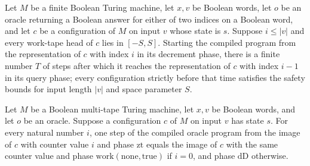 \begin{theorem}
\label{Complexity.LogProg.OIS.index_dec}
\leanok
{}
Let $M$ be a finite Boolean Turing machine, let $x,v$ be Boolean words, let $o$ be an
oracle returning a Boolean answer for either of two indices on a Boolean word, and let
$c$ be a configuration of $M$ on input $v$ whose state is $s$. Suppose $i\le |v|$ and
every work-tape head of $c$ lies in $[-S,S]$. Starting the compiled program from the
representation of $c$ with index $i$ in its decrement phase, there is a finite number
$T$ of steps after which it reaches the representation of $c$ with index $i-1$ in its
query phase; every configuration strictly before that time satisfies the safety bounds
for input length $|v|$ and space parameter $S$.
\end{theorem}

\begin{theorem}
\label{Complexity.LogProg.OIS.zero_step}
\leanok
{}
Let $M$ be a Boolean multi-tape Turing machine, let $x,v$ be Boolean words, and let $o$
be an oracle. Suppose a configuration $c$ of $M$ on input $v$ has state $s$. For every
natural number $i$, one step of the compiled oracle program from the image of $c$ with
counter value $i$ and phase $\mathrm{zt}$ equals the image of $c$ with the same counter
value and phase $\mathrm{work}(\mathrm{none},\mathrm{true})$ if $i=0$, and phase
$\mathrm{dD}$ otherwise.
\end{theorem}

